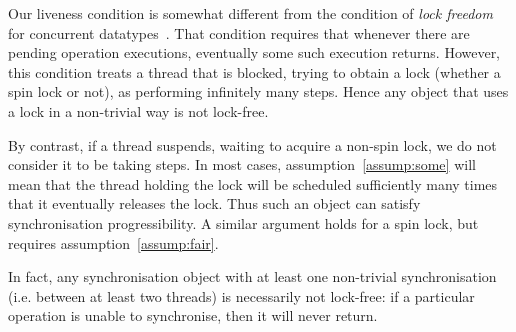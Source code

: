 Our liveness condition is somewhat different from the condition of \emph{lock
  freedom} for concurrent datatypes~\cite{herlihy-shavit}.  That condition
requires that whenever there are pending operation executions, eventually some
such execution returns.  However, this condition treats a thread that is
blocked, trying to obtain a lock (whether a spin lock or not), as performing
infinitely many steps.  Hence any object that uses a lock in a non-trivial way
is not lock-free.



By contrast, if a thread suspends, waiting to acquire a non-spin lock, we do
not consider it to be taking steps.  In most cases,
assumption~\ref{assump:some} will mean that the thread holding the lock will
be scheduled sufficiently many times that it eventually releases the lock.
Thus such an object can satisfy synchronisation progressibility.  A similar
argument holds for a spin lock, but requires assumption~\ref{assump:fair}.

In fact, any synchronisation object
with at least one non-trivial synchronisation (i.e. between at least two
threads) is necessarily not lock-free: if a particular operation is unable to
synchronise, then it will never return.




